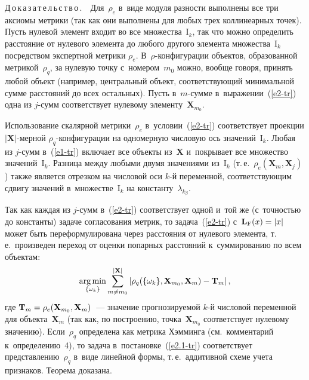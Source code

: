 \begin{multicols}{2}
\vspace*{2pt}

\noindent
     Д\,о\,к\,а\,з\,а\,т\,е\,л\,ь\,с\,т\,в\,о\,.\ \ Для~$\rho_e$ в~виде модуля 
разности выполнены все три аксиомы метрики (так как они выполнены для 
любых трех коллинеарных точек). Пусть нулевой элемент входит во все 
множества~$\mathrm{I}_k$, так что можно определить расстояние от нулевого 
элемента до любого другого элемента множества~$\mathrm{I}_k$ посредством 
экспертной метрики $\rho_e$.  
В~$\rho$-кон\-фи\-гу\-ра\-ции объектов, образованной метрикой~$\rho_q$, за 
нулевую точку с~номером~$m_0$ можно, вообще говоря, принять любой 
объект (например, центральный объект, соответствующий минимальной сумме 
расстояний до всех остальных). Пусть в~$m$-сум\-ме в~выражении~(\ref{e2-tr}) 
одна из $j$-сумм соответствует нулевому элементу~$\mathbf{X}_{m_0}$.
     
     Использование скалярной метрики~$\rho_e$ в~условии~(\ref{e2-tr}) 
соответствует проекции $\vert\mathbf{X}\vert$-мер\-ной  
$\rho_q$-кон\-фи\-гу\-ра\-ции на одномерную числовую ось 
значений~$\mathrm{I}_k$. Любая из $j$-сумм в~(\ref{e1-tr}) включает все 
объекты из~$\mathbf{X}$ и~покрывает все множество 
значений~$\mathrm{I}_k$. Разница между любыми двумя значениями 
из~$\mathrm{I}_k$ (т.\,е.\ $\rho_e(\mathbf{X}_m, \mathbf{X}_j)$) также 
является отрезком на числовой оси $k$-й переменной, соответствующим сдвигу 
значений в~множестве~$\mathrm{I}_k$ на константу~$\lambda_{k_\beta}$. 
     
     Так как каждая из $j$-сумм в~(\ref{e2-tr}) соответствует одной и~той же 
(с~точ\-ностью до константы) задаче согласования метрик, то 
 задача~(\ref{e2-tr}) с~$\mathbf{L}_{\mathrm{F}}(x)\hm= \vert x\vert$ может быть 
переформулирована через расстояния от нулевого элемента, т.\,е.\ произведен 
переход от оценки попарных расстояний к~суммированию по всем объектам:
     \begin{equation}
     \mathop{\mathrm{arg}\,\mathrm{min}}\limits_{\{\omega_k\}} \sum\limits^{\vert \mathbf{X}\vert}_{m\not= 
m_0} \left\vert \rho_q (\{\omega_k\}, \mathbf{X}_{m_0}, \mathbf{X}_m) -
\mathbf{T}_m\right\vert,
     \label{e2.1-tr}
     \end{equation}
     где $\mathbf{T}_m\hm= \rho_e(\mathbf{X}_{m_0}, \mathbf{X}_m)$~--- 
значение прогнозируемой $k$-й числовой переменной для 
объекта~$\mathbf{X}_m$ (так как, по построению, 
точка~$\mathbf{X}_{m_0}$ соответствует нулевому значению). Если~$\rho_q$ 
определена как метрика Хэмминга (см.\ комментарий к~определению~4), то 
задача в~постановке~(\ref{e2.1-tr}) соответствует представлению~$\rho_q$ 
в~виде линейной формы, т.\,е.\ аддитивной схеме учета признаков. Тео\-ре\-ма 
доказана.


\end{multicols}
